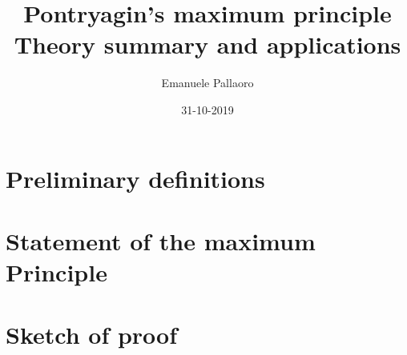 \documentclass[14pt, margin=2pt]{article}
\title{%
	Pontryagin's maximum principle\\
	\large Theory summary and applications
}
\author{Emanuele Pallaoro}
\date{31-10-2019}
\numberwithin{equation}{section}
\begin{document}
\maketitle
\pagestyle{plain}

\newtheorem{teo}{Theorem}[subsection]
\newtheorem*{cor}{Corollary}


\section{Preliminary definitions}

\section{Statement of the maximum Principle}

\section{Sketch of proof}


\end{document}
